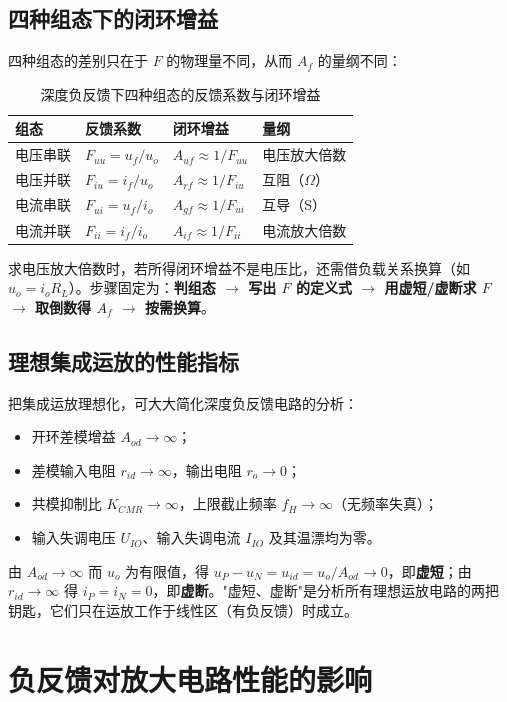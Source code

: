 \subsection{四种组态下的闭环增益}

四种组态的差别只在于 $F$ 的物理量不同，从而 $A_f$ 的量纲不同：

\begin{table}[htbp]
\centering
\caption{深度负反馈下四种组态的反馈系数与闭环增益}
\begin{tabular}{@{}llll@{}}
\hline
组态 & 反馈系数 & 闭环增益 & 量纲 \\
\hline
电压串联 & $F_{uu}=u_f/u_o$ & $A_{uf}\approx1/F_{uu}$ & 电压放大倍数 \\
电压并联 & $F_{iu}=i_f/u_o$ & $A_{rf}\approx1/F_{iu}$ & 互阻（$\Omega$） \\
电流串联 & $F_{ui}=u_f/i_o$ & $A_{gf}\approx1/F_{ui}$ & 互导（S） \\
电流并联 & $F_{ii}=i_f/i_o$ & $A_{if}\approx1/F_{ii}$ & 电流放大倍数 \\
\hline
\end{tabular}
\end{table}

求电压放大倍数时，若所得闭环增益不是电压比，还需借负载关系换算（如 $u_o=i_oR_L$）。步骤固定为：\textbf{判组态 $\to$ 写出 $F$ 的定义式 $\to$ 用虚短/虚断求 $F$ $\to$ 取倒数得 $A_f$ $\to$ 按需换算}。

\subsection{理想集成运放的性能指标}

把集成运放理想化，可大大简化深度负反馈电路的分析：
\begin{itemize}
    \item 开环差模增益 $A_{od}\to\infty$；
    \item 差模输入电阻 $r_{id}\to\infty$，输出电阻 $r_o\to0$；
    \item 共模抑制比 $K_{CMR}\to\infty$，上限截止频率 $f_H\to\infty$（无频率失真）；
    \item 输入失调电压 $U_{IO}$、输入失调电流 $I_{IO}$ 及其温漂均为零。
\end{itemize}
由 $A_{od}\to\infty$ 而 $u_o$ 为有限值，得 $u_P-u_N=u_{id}=u_o/A_{od}\to0$，即\textbf{虚短}；由 $r_{id}\to\infty$ 得 $i_P=i_N=0$，即\textbf{虚断}。"虚短、虚断"是分析所有理想运放电路的两把钥匙，它们只在运放工作于线性区（有负反馈）时成立。

\section{负反馈对放大电路性能的影响}

